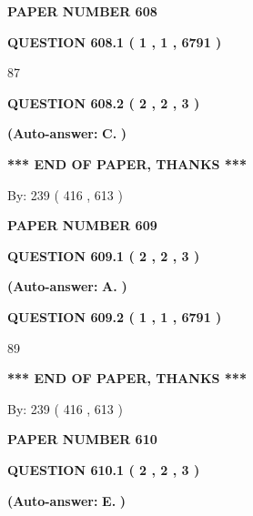 \documentclass{ctexart}
\begin{document}
   
\newpage 
\setcounter{page}{ 
   608001 } 
   
   
 {\textbf{ \Large{ PAPER NUMBER  608  }}}
   
   
   
   
  
  
{\textbf{\large{QUESTION
608.1 
 ( 1 , 1 , 6791 )
}}}

87
  
  
{\textbf{\large{QUESTION
608.2 
 ( 2 , 2 , 3 )
}}}
 
 
{\textbf{(Auto-answer:}}
{\textbf{\large{
C.}}}
{\textbf{)}}
 
 
   
   
   
   
\vspace{1.0in} 
{\textbf{\large{ *** END OF PAPER, THANKS *** }}} 
   
   
\hspace{1.0in} By: 
 239 ( 416 ,  613 )
   
   
   
   
\newpage 
\setcounter{page}{ 
   609001 } 
   
   
 {\textbf{ \Large{ PAPER NUMBER  609  }}}
   
   
   
   
  
  
{\textbf{\large{QUESTION
609.1 
 ( 2 , 2 , 3 )
}}}
 
 
{\textbf{(Auto-answer:}}
{\textbf{\large{
A.}}}
{\textbf{)}}
 
 
  
  
{\textbf{\large{QUESTION
609.2 
 ( 1 , 1 , 6791 )
}}}

89
   
   
   
   
\vspace{1.0in} 
{\textbf{\large{ *** END OF PAPER, THANKS *** }}} 
   
   
\hspace{1.0in} By: 
 239 ( 416 ,  613 )
   
   
   
   
\newpage 
\setcounter{page}{ 
   610001 } 
   
   
 {\textbf{ \Large{ PAPER NUMBER  610  }}}
   
   
   
   
  
  
{\textbf{\large{QUESTION
610.1 
 ( 2 , 2 , 3 )
}}}
 
 
{\textbf{(Auto-answer:}}
{\textbf{\large{
E.}}}
{\textbf{)}}
 
 
  
\end{document}

